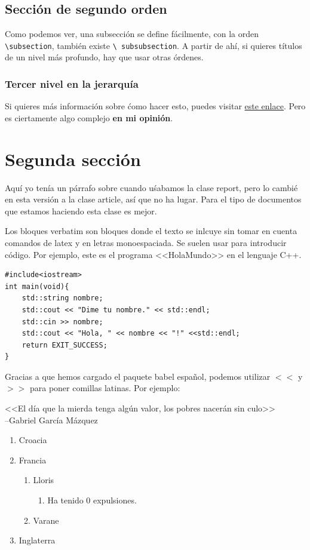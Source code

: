 \documentclass{article}
\begin{document}
\subsection{Sección de segundo orden}

Como podemos ver, una subsección se define fácilmente, con la orden
\texttt{\textbackslash subsection}, también existe \texttt{\textbackslash
subsubsection}. A partir de ahí, si quieres títulos de un nivel más profundo,
hay que usar otras órdenes.
\subsubsection{Tercer nivel en la jerarquía}
Si quieres más información sobre ćomo hacer esto, puedes visitar
\href{https://ctan.org/pkg/titlesec}{este enlace}.
Pero es ciertamente algo complejo \textbf{en mi opinión}.
\section{Segunda sección}
Aquí yo tenía un párrafo sobre cuando uśabamos la clase report, pero lo cambié
en esta versión a la clase article, así que no ha lugar. Para el tipo de
documentos que estamos haciendo esta clase es mejor. 

Los bloques verbatim son bloques donde el texto se inlcuye sin tomar en 
cuenta comandos de latex y en letras monoespaciada.
Se suelen usar para introducir código. Por ejemplo, este es el programa
<<HolaMundo>> en el lenguaje C++.

\begin{verbatim} 
#include<iostream>
int main(void){
    std::string nombre;
    std::cout << "Dime tu nombre." << std::endl;
    std::cin >> nombre;
    std::cout << "Hola, " << nombre << "!" <<std::endl;
    return EXIT_SUCCESS;
}
\end{verbatim}
Gracias a que hemos cargado el paquete babel español,
podemos utilizar $<<$ y $>>$ para poner comillas latinas. Por ejemplo:

<<El día que la mierda tenga algún valor, los pobres nacerán sin culo>> \\
--Gabriel García Mázquez

\begin{enumerate}
\item Croacia
    \item Francia
        \begin{enumerate} %
            \item Lloris
                \begin{enumerate}
                    \item Ha tenido 0 expulsiones.
                \end{enumerate}
            \item Varane
        \end{enumerate}
    \item Inglaterra
\end{enumerate}
\end{document}
